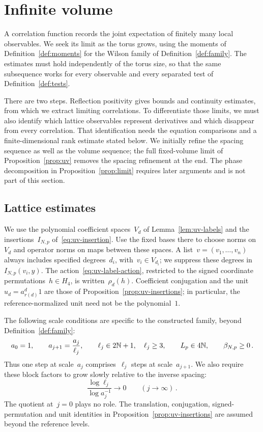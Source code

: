 \section{Infinite volume}\label{sec:infinite-volume}

A correlation function records the joint expectation of finitely many local observables.
We seek its limit as the torus grows, using the moments of Definition~\ref{def:moments} for the Wilson family of Definition~\ref{def:family}.
The estimates must hold independently of the torus size, so that the same subsequence works for every observable and every separated test of Definition~\ref{def:tests}.

There are two steps.
Reflection positivity gives bounds and continuity estimates, from which we extract limiting correlations.
To differentiate those limits, we must also identify which lattice observables represent derivatives and which disappear from every correlation.
That identification needs the equation comparisons and a finite-dimensional rank estimate stated below.
We initially refine the spacing sequence as well as the volume sequence; the full fixed-volume limit of Proposition~\ref{prop:uv} removes the spacing refinement at the end.
The phase decomposition in Proposition~\ref{prop:limit} requires later arguments and is not part of this section.

\subsection{Lattice estimates}\label{subsec:iv-lattice}

We use the polynomial coefficient spaces~$V_d$ of Lemma~\ref{lem:uv-labels} and the insertions~$I_{N,p}$ of~\eqref{eq:uv-insertion}.
Use the fixed bases there to choose norms on~$V_d$ and operator norms on maps between these spaces.
A list~$v=(v_1,\ldots,v_n)$ always includes specified degrees~$d_i$, with~$v_i\in V_{d_i}$; we suppress these degrees in~$I_{N,p}(v_i,y)$.
The action~\eqref{eq:uv-label-action}, restricted to the signed coordinate permutations~$h\in H_4$, is written~$\rho_d(h)$.
Coefficient conjugation and the unit~$u_d=a_{r(d)}^d1$ are those of Proposition~\ref{prop:uv-insertions}; in particular, the reference-normalized unit need not be the polynomial~$1$.

The following scale conditions are specific to the constructed family, beyond Definition~\ref{def:family}:
\begin{equation}\label{eq:iv-scales}
 a_0=1,\qquad a_{j+1}=\frac{a_j}{\ell_j},\qquad
 \ell_j\in2\mathbb N+1,\quad \ell_j\ge3,\qquad L_p\in4\mathbb N,\qquad \beta_{N,p}\ge0\,.
\end{equation}
Thus one step at scale~$a_j$ comprises~$\ell_j$ steps at scale~$a_{j+1}$.
We also require these block factors to grow slowly relative to the inverse spacing:
\begin{equation}\label{eq:iv-gentle}
\frac{\log\ell_j}{\log a_j^{-1}}\longrightarrow0\qquad(j\longrightarrow\infty)\,.
\end{equation}
The quotient at~$j=0$ plays no role.
The translation, conjugation, signed-permutation and unit identities in Proposition~\ref{prop:uv-insertions} are assumed beyond the reference levels.

